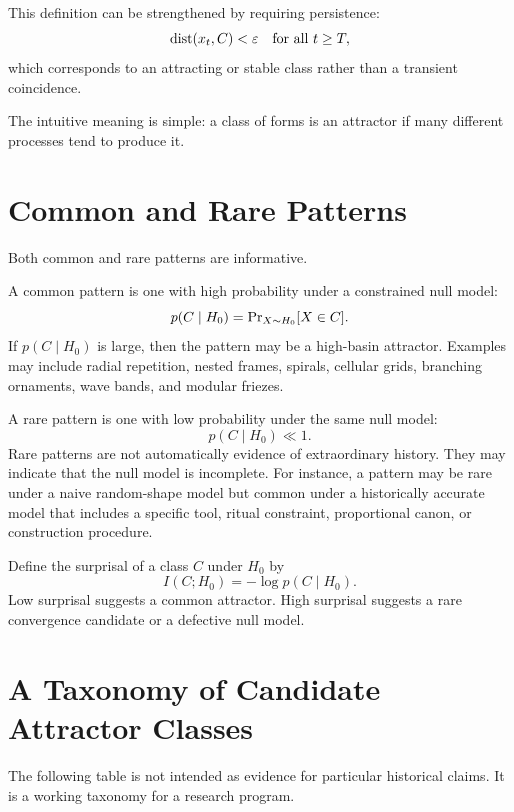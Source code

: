 This definition can be strengthened by requiring persistence:
\begin{equation}
    \operatorname{dist}(x_t,C)<\varepsilon \quad \text{for all } t \geq T,
\end{equation}
which corresponds to an attracting or stable class rather than a transient coincidence.

The intuitive meaning is simple: a class of forms is an attractor if many different processes tend to produce it.

\section{Common and Rare Patterns}

Both common and rare patterns are informative.

A common pattern is one with high probability under a constrained null model:
\begin{equation}
    p(C\mid H_0)=\operatorname{Pr}_{X\sim H_0}[X\in C].
\end{equation}
If $p(C\mid H_0)$ is large, then the pattern may be a high-basin attractor. Examples may include radial repetition, nested frames, spirals, cellular grids, branching ornaments, wave bands, and modular friezes.

A rare pattern is one with low probability under the same null model:
\begin{equation}
    p(C\mid H_0) \ll 1.
\end{equation}
Rare patterns are not automatically evidence of extraordinary history. They may indicate that the null model is incomplete. For instance, a pattern may be rare under a naive random-shape model but common under a historically accurate model that includes a specific tool, ritual constraint, proportional canon, or construction procedure.

Define the surprisal of a class $C$ under $H_0$ by
\begin{equation}
    I(C;H_0)=-\log p(C\mid H_0).
\end{equation}
Low surprisal suggests a common attractor. High surprisal suggests a rare convergence candidate or a defective null model.

\section{A Taxonomy of Candidate Attractor Classes}

The following table is not intended as evidence for particular historical claims. It is a working taxonomy for a research program.

